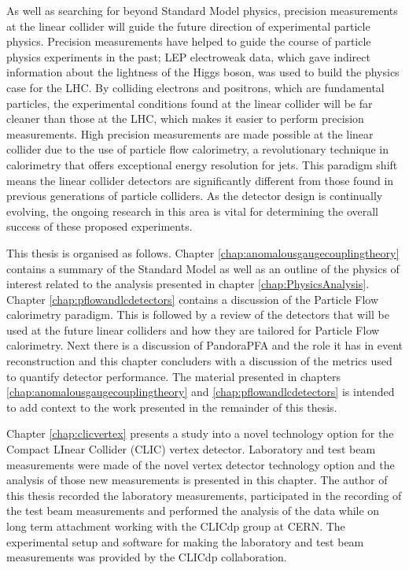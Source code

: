 As well as searching for beyond Standard Model physics, precision measurements at the linear collider will guide the future direction of experimental particle physics.  Precision measurements have helped to guide the course of particle physics experiments in the past; LEP electroweak data, which gave indirect information about the lightness of the Higgs boson, was used to build the physics case for the LHC.  By colliding electrons and positrons, which are fundamental particles, the experimental conditions found at the linear collider will be far cleaner than those at the LHC, which makes it easier to perform precision measurements.  High precision measurements are made possible at the linear collider due to the use of particle flow calorimetry, a revolutionary technique in calorimetry that offers exceptional energy resolution for jets.  This paradigm shift means the linear collider detectors are significantly different from those found in previous generations of particle colliders.  As the detector design is continually evolving, the ongoing research in this area is vital for determining the overall success of these proposed experiments.  

This thesis is organised as follows.  Chapter \ref{chap:anomalousgaugecouplingtheory} contains a summary of the Standard Model as well as an outline of the physics of interest related to the analysis presented in chapter \ref{chap:PhysicsAnalysis}.  {Chapter \ref{chap:pflowandlcdetectors} contains a discussion of the Particle Flow calorimetry paradigm.  This is followed by a review of the detectors that will be used at the future linear colliders and how they are tailored for Particle Flow calorimetry.  Next there is a discussion of PandoraPFA and the role it has in event reconstruction and this chapter concluders with a discussion of the metrics used to quantify detector performance.  The material presented in chapters \ref{chap:anomalousgaugecouplingtheory} and \ref{chap:pflowandlcdetectors} is intended to add context to the work presented in the remainder of this thesis.}

Chapter \ref{chap:clicvertex} presents a study into a novel technology option for the Compact LInear Collider (CLIC) vertex detector.  {Laboratory and test beam measurements were made of the novel vertex detector technology option and the analysis of those new measurements is presented in this chapter.  The author of this thesis recorded the laboratory measurements, participated in the recording of the test beam measurements and performed the analysis of the data while on long term attachment working with the CLICdp group at CERN.  The experimental setup and software for making the laboratory and test beam measurements was provided by the CLICdp collaboration.}

